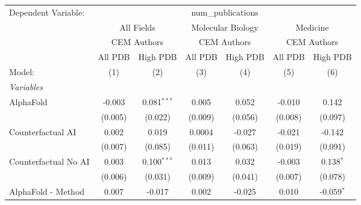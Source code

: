 \begingroup
\centering
\begin{tabular}{lcccccc}
   \tabularnewline \midrule \midrule
   Dependent Variable: & \multicolumn{6}{c}{num\_publications}\\
 & \multicolumn{2}{c}{All Fields} & \multicolumn{2}{c}{Molecular Biology} & \multicolumn{2}{c}{Medicine} \\
\cmidrule(lr){2-3} \cmidrule(lr){4-5} \cmidrule(lr){6-7}
 & \multicolumn{2}{c}{CEM Authors} & \multicolumn{2}{c}{CEM Authors} & \multicolumn{2}{c}{CEM Authors} \\
\cmidrule(lr){2-3} \cmidrule(lr){4-5} \cmidrule(lr){6-7}
 & \multicolumn{1}{c}{All PDB} & \multicolumn{1}{c}{High PDB} & \multicolumn{1}{c}{All PDB} & \multicolumn{1}{c}{High PDB} & \multicolumn{1}{c}{All PDB} & \multicolumn{1}{c}{High PDB} \\
\cmidrule(lr){2-2} \cmidrule(lr){3-3} \cmidrule(lr){4-4} \cmidrule(lr){5-5} \cmidrule(lr){6-6} \cmidrule(lr){7-7}
   Model:                                                     & (1)          & (2)           & (3)          & (4)            & (5)           & (6)\\  
   \midrule
   \emph{Variables}\\
   AlphaFold                                                  & -0.003       & 0.081$^{***}$ & 0.005        & 0.052          & -0.010        & 0.142\\   
                                                              & (0.005)      & (0.022)       & (0.009)      & (0.056)        & (0.008)       & (0.097)\\   
   Counterfactual AI                                          & 0.002        & 0.019         & 0.0004       & -0.027         & -0.021        & -0.142\\   
                                                              & (0.007)      & (0.085)       & (0.011)      & (0.063)        & (0.019)       & (0.091)\\   
   Counterfactual No AI                                       & 0.003        & 0.100$^{***}$ & 0.013        & 0.032          & -0.003        & 0.138$^{*}$\\   
                                                              & (0.006)      & (0.031)       & (0.009)      & (0.041)        & (0.007)       & (0.078)\\   
   AlphaFold - Method                                         & 0.007        & -0.017        & 0.002        & -0.025         & 0.010         & -0.059$^{*}$\\   

\end{tabular}
